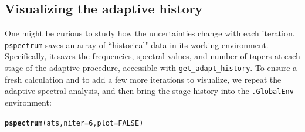 \documentclass{article}\usepackage{graphicx, color}
\makeatletter
\newcommand{\hlfunctioncall}[1]{\textcolor[rgb]{0.501960784313725,0,0.329411764705882}{\textbf{#1}}}%
\newenvironment{kframe}{%
 \def\at@end@of@kframe{}%
 \ifinner\ifhmode%
  \def\at@end@of@kframe{\end{minipage}}%
  \begin{minipage}{\columnwidth}%
 \fi\fi%
 \def\FrameCommand##1{\hskip\@totalleftmargin \hskip-\fboxsep
 \colorbox{shadecolor}{##1}\hskip-\fboxsep
     \hskip-\linewidth \hskip-\@totalleftmargin \hskip\columnwidth}%
 \MakeFramed {\advance\hsize-\width
   \@totalleftmargin\z@ \linewidth\hsize
   \@setminipage}}%
 {\par\unskip\endMakeFramed%
 \at@end@of@kframe}
\newenvironment{knitrout}{}{} %
\newcommand{\Rcmd}[1]{\texttt{#1}}
\makeatother
\begin{document}
\subsection{Visualizing the adaptive history}
One might be curious to study how the
uncertainties change with each iteration.
\Rcmd{pspectrum}
 saves an array of ``historical" data in its working environment.
 Specifically, it saves the frequencies,
 spectral values, and number of tapers at each stage of the adaptive
 procedure, accessible with \Rcmd{get\_adapt\_history}.
 To ensure a fresh calculation and to 
 add a few more iterations to visualize, 
we repeat the adaptive spectral analysis, 
and then bring the stage history into the \Rcmd{.GlobalEnv} environment:
\begin{knitrout}
\color{fgcolor}\begin{kframe}
\begin{alltt}
\hlfunctioncall{pspectrum}(ats, niter = 6, plot = FALSE)
\end{alltt}


{\ttfamily\noindent\itshape\color{messagecolor}{\#\# Stage\ \ 0 est. (pilot)}}

{\ttfamily\noindent\itshape\color{messagecolor}{\#\# 	environment\ \ ** .rlpSpecEnv **\ \ refreshed}}

{\ttfamily\noindent\itshape\color{messagecolor}{\#\# Stage\ \ 1 est. (Ave. S.V.R. -7.9 dB)}}

{\ttfamily\noindent\itshape\color{messagecolor}{\#\# Stage\ \ 2 est. (Ave. S.V.R. -21.3 dB)}}

{\ttfamily\noindent\itshape\color{messagecolor}{\#\# Stage\ \ 3 est. (Ave. S.V.R. -29.1 dB)}}

{\ttfamily\noindent\itshape\color{messagecolor}{\#\# Stage\ \ 4 est. (Ave. S.V.R. -34.9 dB)}}

{\ttfamily\noindent\itshape\color{messagecolor}{\#\# Stage\ \ 5 est. (Ave. S.V.R. -36.7 dB)}}

{\ttfamily\noindent\itshape\color{messagecolor}{\#\# Stage\ \ 6 est. (Ave. S.V.R. -35.2 dB)}}


\end{kframe}
\end{knitrout}
\end{document}
